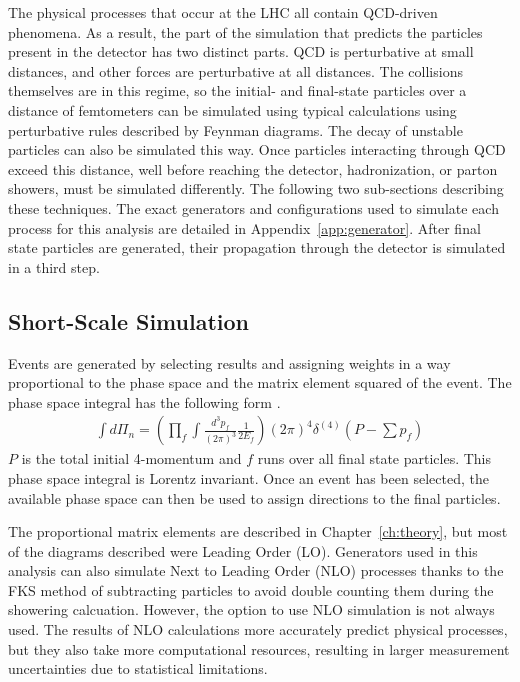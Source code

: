 The physical processes that occur at the LHC all contain QCD-driven phenomena.
As a result, the part of the simulation that predicts the particles present in the detector
has two distinct parts.
QCD is perturbative at small distances,
and other forces are perturbative at all distances.
The collisions themselves are in this regime,
so the initial- and final-state particles over a distance of femtometers
can be simulated using typical calculations using
perturbative rules described by Feynman diagrams.
The decay of unstable particles can also be simulated this way.
Once particles interacting through QCD exceed this distance,
well before reaching the detector,
hadronization, or parton showers, must be simulated differently.
The following two sub-sections describing these techniques.
The exact generators and configurations used to simulate each process for this analysis
are detailed in Appendix~\ref{app:generator}.
After final state particles are generated,
their propagation through the detector is simulated in a third step.

\subsection{Short-Scale Simulation}

Events are generated by selecting results and assigning weights in a way proportional
to the phase space and the matrix element squared of the event.
The phase space integral has the following form \cite{Peskin:257493}.
\begin{gather}
  \int d\Pi_n = \left( \prod_f \int \frac{d^3p_f}{(2\pi)^3} \frac{1}{2E_f} \right)
                (2\pi)^4 \delta^{(4)}(P - \sum p_f)
\end{gather}
$P$ is the total initial 4-momentum and $f$ runs over all final state particles.
This phase space integral is Lorentz invariant.
Once an event has been selected, the available phase space can then be used to assign
directions to the final particles.

The proportional matrix elements are described in Chapter~\ref{ch:theory},
but most of the diagrams described were Leading Order (LO).
Generators used in this analysis can also simulate Next to Leading Order (NLO) processes
thanks to the FKS method of subtracting particles to avoid double counting them during the
showering calcuation.
However, the option to use NLO simulation is not always used.
The results of NLO calculations more accurately predict physical processes,
but they also take more computational resources,
resulting in larger measurement uncertainties due to statistical limitations.

